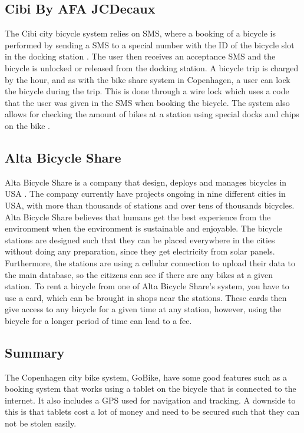 \subsection{Cibi By AFA JCDecaux}
The Cibi city bicycle system relies on SMS, where a booking of a bicycle is performed by sending a SMS to a special number with the ID of the bicycle slot in the docking station \citep{misc:cibi}. 
The user then receives an acceptance SMS and the bicycle is unlocked or released from the docking station. 
A bicycle trip is charged by the hour, and as with the bike share system in Copenhagen, a user can lock the bicycle during the trip. 
This is done through a wire lock which uses a code that the user was given in the SMS when booking the bicycle.
The system also allows for checking the amount of bikes at a station using special docks and chips on the bike \citep{misc:omcibi}.

\subsection{Alta Bicycle Share}
Alta Bicycle Share is a company that design, deploys and manages bicycles in USA \citep{misc:AltaBicycleShare}.
The company currently have projects ongoing in nine different cities in USA, with more than thousands of stations and over tens of thousands bicycles. 
Alta Bicycle Share believes that humans get the best experience from the environment when the environment is sustainable and enjoyable.
The bicycle stations are designed such that they can be placed everywhere in the cities without doing any preparation, since they get electricity from solar panels.
Furthermore, the stations are using a cellular connection to upload their data to the main database, so the citizens can see if there are any bikes at a given station.
To rent a bicycle from one of Alta Bicycle Share's system, you have to use a card, which can be brought in shops near the stations.
These cards then give access to any bicycle for a given time at any station, however, using the bicycle for a longer period of time can lead to a fee.

\subsection{Summary}
The Copenhagen city bike system, GoBike, have some good features such as a booking system that works using a tablet on the bicycle that is connected to the internet.
It also includes a GPS used for navigation and tracking.
A downside to this is that tablets cost a lot of money and need to be secured such that they can not be stolen easily. 

